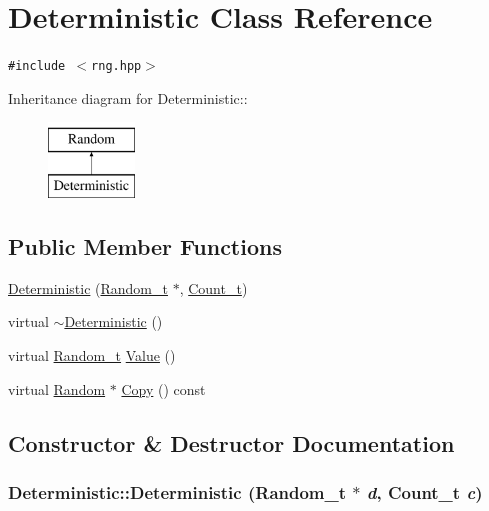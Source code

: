 \hypertarget{classDeterministic}{
\section{Deterministic Class Reference}
\label{classDeterministic}
}
{\tt \#include $<$rng.hpp$>$}

Inheritance diagram for Deterministic::\begin{figure}[H]
\begin{center}
\leavevmode
\includegraphics[height=2cm]{classDeterministic}
\end{center}
\end{figure}
\subsection*{Public Member Functions}
\begin{CompactItemize}
\item 
\hyperlink{classDeterministic_5012c74e6c4158a0d8dc1a5a9b625a98}{Deterministic} (\hyperlink{rng_8hpp_ad41e7f5d86b1109b6a6a032c86cdd3f}{Random\_\-t} $\ast$, \hyperlink{common-defs_8hpp_bdd4d02aefa61ef2e943e2c6a09566c6}{Count\_\-t})
\item 
virtual \hyperlink{classDeterministic_b14fdbe43ddacba07192a79b35bc76f7}{$\sim$Deterministic} ()
\item 
virtual \hyperlink{rng_8hpp_ad41e7f5d86b1109b6a6a032c86cdd3f}{Random\_\-t} \hyperlink{classDeterministic_5bca3d51cb08d3ec23579e09ce8e713f}{Value} ()
\item 
virtual \hyperlink{classRandom}{Random} $\ast$ \hyperlink{classDeterministic_4eb4260ecbc55661f1d9c268e6684ea4}{Copy} () const 
\end{CompactItemize}


\subsection{Constructor \& Destructor Documentation}
\hypertarget{classDeterministic_5012c74e6c4158a0d8dc1a5a9b625a98}{
\subsubsection[{Deterministic}]{\setlength{\rightskip}{0pt plus 5cm}Deterministic::Deterministic ({\bf Random\_\-t} $\ast$ {\em d}, \/  {\bf Count\_\-t} {\em c})}}
\label{classDeterministic_5012c74e6c4158a0d8dc1a5a9b625a98}


